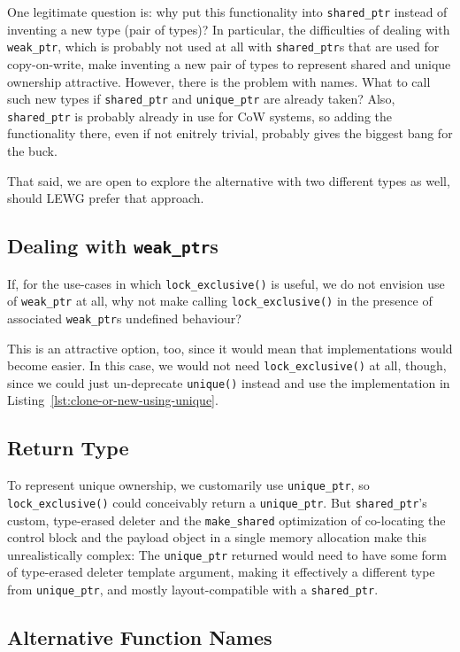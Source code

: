 \documentclass[11pt]{article}
\newcommand{\lockx}{\texttt{lock\_exclusive()}}
\newcommand{\uptr}{\texttt{unique\_ptr}}
\newcommand{\wptr}{\texttt{weak\_ptr}}
\newcommand{\sptr}{\texttt{shared\_ptr}}
\newcommand{\makeshared}{\texttt{make\_shared}}
\begin{document}
One legitimate question is: why put this functionality into \sptr{}
instead of inventing a new type (pair of types)? In particular, the
difficulties of dealing with \wptr, which is probably not used at all
with \sptr{}s that are used for copy-on-write, make inventing a new
pair of types to represent shared and unique ownership
attractive. However, there is the problem with names. What to call
such new types if \sptr{} and \uptr{} are already taken? Also, \sptr{}
is probably already in use for CoW systems, so adding the
functionality there, even if not enitrely trivial, probably gives the
biggest bang for the buck.

That said, we are open to explore the alternative with two different
types as well, should LEWG prefer that approach.

\subsection{Dealing with \wptr{}s}

If, for the use-cases in which \lockx{} is useful, we do not envision
use of \wptr{} at all, why not make calling \lockx{} in the presence
of associated \wptr{}s undefined behaviour?

This is an attractive option, too, since it would mean that
implementations would become easier. In this case, we would not need
\lockx{} at all, though, since we could just un-deprecate
\texttt{unique()} instead and use the implementation in
Listing~\ref{lst:clone-or-new-using-unique}.

\subsection{Return Type}

To represent unique ownership, we customarily use \uptr, so \lockx{}
could conceivably return a \uptr. But \sptr{}'s custom, type-erased
deleter and the \makeshared{} optimization of co-locating the control
block and the payload object in a single memory allocation make this
unrealistically complex: The \uptr{} returned would need to have some
form of type-erased deleter template argument, making it effectively a
different type from \uptr, and mostly layout-compatible with a
\sptr{}.

\subsection{Alternative Function Names}
\end{document}
